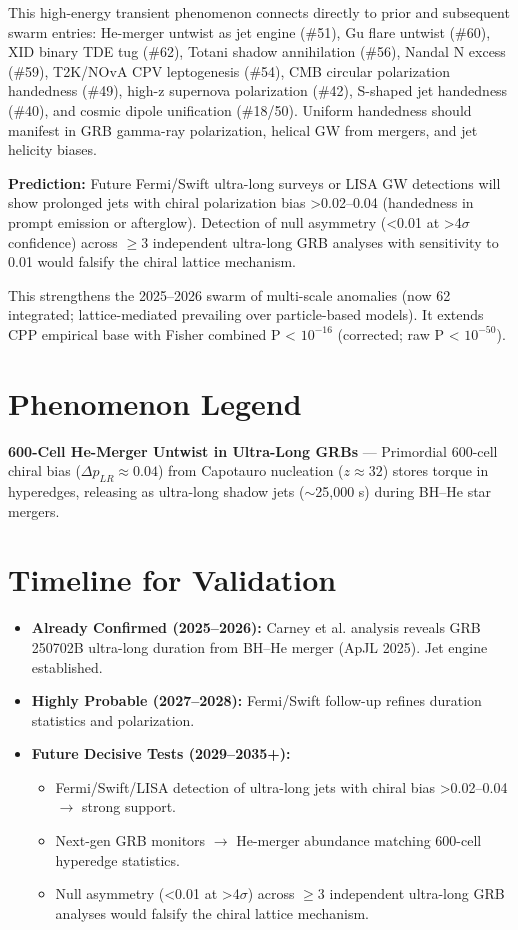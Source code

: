 \documentclass[11pt]{article}
\begin{document}
This high-energy transient phenomenon connects directly to prior and subsequent swarm entries: He-merger untwist as jet engine (\#51), Gu flare untwist (\#60), XID binary TDE tug (\#62), Totani shadow annihilation (\#56), Nandal N excess (\#59), T2K/NOvA CPV leptogenesis (\#54), CMB circular polarization handedness (\#49), high-z supernova polarization (\#42), S-shaped jet handedness (\#40), and cosmic dipole unification (\#18/50). Uniform handedness should manifest in GRB gamma-ray polarization, helical GW from mergers, and jet helicity biases.

\textbf{Prediction:} Future Fermi/Swift ultra-long surveys or LISA GW detections will show prolonged jets with chiral polarization bias >0.02--0.04 (handedness in prompt emission or afterglow). Detection of null asymmetry (<0.01 at >4$\sigma$ confidence) across $\geq 3$ independent ultra-long GRB analyses with sensitivity to 0.01 would falsify the chiral lattice mechanism.

This strengthens the 2025--2026 swarm of multi-scale anomalies (now 62 integrated; lattice-mediated prevailing over particle-based models). It extends CPP empirical base with Fisher combined P < $10^{-16}$ (corrected; raw P < $10^{-50}$).

\section{Phenomenon Legend}
\textbf{600-Cell He-Merger Untwist in Ultra-Long GRBs} — Primordial 600-cell chiral bias ($\Delta p_{LR} \approx 0.04$) from Capotauro nucleation ($z \approx 32$) stores torque in hyperedges, releasing as ultra-long shadow jets ($\sim$25,000 s) during BH–He star mergers.

\section{Timeline for Validation}
\begin{itemize}
    \item \textbf{Already Confirmed (2025--2026):} Carney et al. analysis reveals GRB 250702B ultra-long duration from BH–He merger (ApJL 2025). Jet engine established.
    \item \textbf{Highly Probable (2027--2028):} Fermi/Swift follow-up refines duration statistics and polarization.
    \item \textbf{Future Decisive Tests (2029--2035+):}
    \begin{itemize}
        \item Fermi/Swift/LISA detection of ultra-long jets with chiral bias >0.02--0.04 $\to$ strong support.
        \item Next-gen GRB monitors $\to$ He-merger abundance matching 600-cell hyperedge statistics.
        \item Null asymmetry (<0.01 at >4$\sigma$) across $\geq 3$ independent ultra-long GRB analyses would falsify the chiral lattice mechanism.
    \end{itemize}
\end{itemize}
\end{document}
